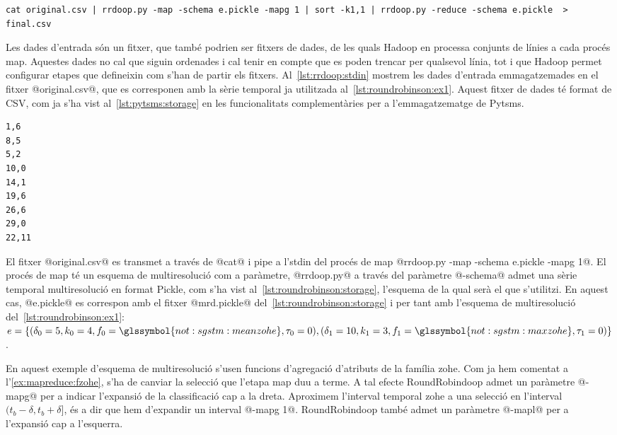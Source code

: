 \begin{lstlisting}[style=sh,caption=Execució a la shell de
  rrdoop.py,label=lst:rrdoop:shell]
cat original.csv | rrdoop.py -map -schema e.pickle -mapg 1 | sort -k1,1 | rrdoop.py -reduce -schema e.pickle  > final.csv
\end{lstlisting}


Les dades d'entrada són un fitxer, que també podrien ser fitxers de
dades, de les quals Hadoop en processa conjunts de línies a cada
procés map. Aquestes dades no cal que siguin ordenades i cal tenir en
compte que es poden trencar per qualsevol línia, tot i que Hadoop
permet configurar etapes que defineixin com s'han de partir els
fitxers.  Al~\autoref{lst:rrdoop:stdin} mostrem les dades d'entrada
emmagatzemades en el fitxer @original.csv@, que es corresponen
amb la sèrie temporal ja utilitzada
al~\autoref{lst:roundrobinson:ex1}.  Aquest fitxer de dades té format
de \gls{CSV}, com ja s'ha vist al~\autoref{lst:pytsms:storage} en les
funcionalitats complementàries per a l'emmagatzematge de Pytsms.
\begin{lstlisting}[style=file,caption=Dades d'entrada original.csv,label=lst:rrdoop:stdin]
1,6
8,5
5,2
10,0
14,1
19,6
26,6
29,0
22,11
\end{lstlisting}


El fitxer @original.csv@ es transmet a través de @cat@ i pipe a
l'stdin del procés de map %
@rrdoop.py -map -schema e.pickle -mapg 1@.  El procés de map té un esquema de
multiresolució com a paràmetre, @rrdoop.py@ a través del paràmetre
@-schema@ admet una sèrie temporal multiresolució en format Pickle,
com s'ha vist al~\autoref{lst:roundrobinson:storage}, l'esquema de la
qual serà el que s'utilitzi. En aquest cas, @e.pickle@ es correspon
amb el fitxer @mrd.pickle@ del~\autoref{lst:roundrobinson:storage} i
per tant amb l'esquema de multiresolució
del~\autoref{lst:roundrobinson:ex1}:
$e=\{(\delta_0=5,k_0=4,f_0=\glssymbol{not:sgstm:meanzohe},\tau_0=0),(\delta_1=10,k_1=3,f_1=\glssymbol{not:sgstm:maxzohe},\tau_1=0)\}$.


En aquest exemple d'esquema de multiresolució s'usen funcions
d'agregació d'atributs de la família \gls{zohe}. Com ja hem comentat a
l'\autoref{ex:mapreduce:fzohe}, s'ha de canviar la selecció que
l'etapa map duu a terme. A tal efecte RoundRobindoop admet un
paràmetre @-mapg@ per a indicar l'expansió de la classificació cap a
la dreta. Aproximem l'interval temporal \gls{zohe} a una selecció en
l'interval $(t_b-\delta,t_b+\delta]$, és a dir que hem d'expandir un
interval @-mapg 1@.  RoundRobindoop també admet un paràmetre @-mapl@
per a l'expansió cap a l'esquerra.



